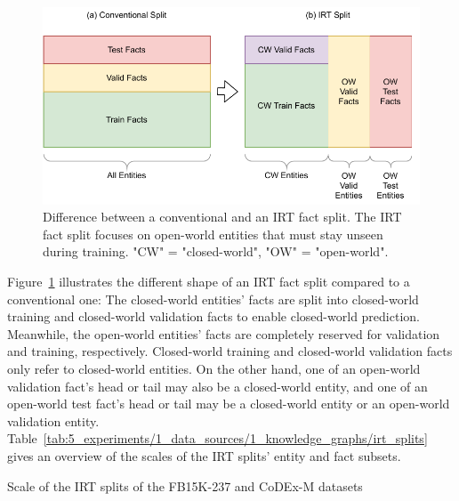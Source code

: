 \begin{figure}
    \centering
    \includegraphics[width=\textwidth]{5_experiments/1_data_sources/1_knowledge_graphs/irt_split}
    \caption{Difference between a conventional and an IRT fact split. The IRT fact split focuses on open-world entities that must stay unseen during training. "CW" = "closed-world", "OW" = "open-world".}
    \label{fig:5_experiments/1_data_sources/1_knowledge_graphs/irt_split}
\end{figure}

Figure~\ref{fig:5_experiments/1_data_sources/1_knowledge_graphs/irt_split} illustrates the different shape of an IRT fact split compared to a conventional one: The closed-world entities' facts are split into closed-world training and closed-world validation facts to enable closed-world prediction. Meanwhile, the open-world entities' facts are completely reserved for validation and training, respectively. Closed-world training and closed-world validation facts only refer to closed-world entities. On the other hand, one of an open-world validation fact's head or tail may also be a closed-world entity, and one of an open-world test fact's head or tail may be a closed-world entity or an open-world validation entity. Table~\ref{tab:5_experiments/1_data_sources/1_knowledge_graphs/irt_splits} gives an overview of the scales of the IRT splits' entity and fact subsets.

\begin{table}[h]
    \centering
    
    \caption{Scale of the IRT splits of the FB15K-237 and CoDEx-M datasets}
    \label{tab:5_experiments/1_data_sources/1_knowledge_graphs/irt_splits}
\end{table}
